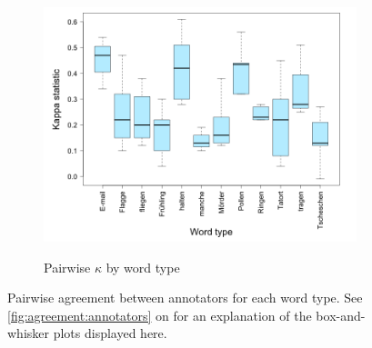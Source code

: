 \begin{figure}[phtb]
			\begin{subfigure}{\textwidth}
				\centering
				\caption{Pairwise $\kappa$ by word type}
				\includegraphics[width=\textwidth]{img/plots/pairwiseKappaByWord-noTitle}
				\label{fig:agreement:words:k}
			\end{subfigure}%
			
			
			
			\caption[Pairwise agreement statistics by word type]{Pairwise agreement between annotators for each word type. 
			See \cref{fig:agreement:annotators} on  for an explanation of the box-and-whisker plots displayed here.
			}

			
			
			\label{fig:agreement:words}
		\end{figure}
		
		
		
